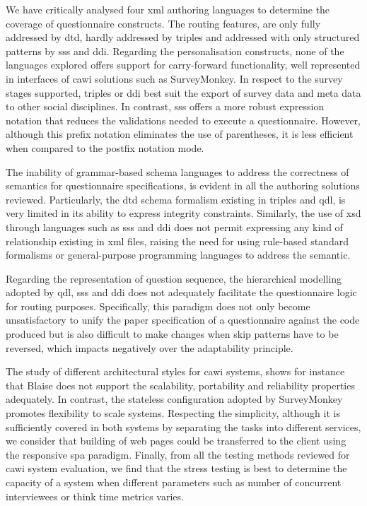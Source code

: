 	We have critically analysed four \gls{xml} authoring languages to determine the coverage of questionnaire constructs. The routing features, are only fully addressed by \gls{dtd}, hardly addressed by \gls{triples} and addressed with only structured patterns by \gls{sss} and \gls{ddi}. Regarding the personalisation constructs, none of the languages explored offers support for carry-forward functionality, well represented in interfaces of \gls{cawi} solutions such as SurveyMonkey. In respect to the survey stages supported, \gls{triples} or \gls{ddi} best suit the export of survey data and meta data to other social disciplines. In contrast, \gls{sss} offers a more robust expression notation that reduces the validations needed to execute a questionnaire. However, although this prefix notation eliminates the use of parentheses, it is less efficient when compared to the postfix notation mode.

	The inability of grammar-based schema languages to address the correctness of semantics for questionnaire specifications, is evident in all the authoring solutions reviewed. Particularly, the \gls{dtd} schema formalism existing in \gls{triples} and \gls{qdl}, is very limited in its ability to express integrity constraints. Similarly, the use of \gls{xsd} through languages such as \gls{sss} and \gls{ddi} does not permit expressing any kind of relationship existing in \gls{xml} files, raising the need for using rule-based standard formalisms or general-purpose programming languages to address the semantic.

	Regarding the representation of question sequence, the hierarchical modelling adopted by \gls{qdl}, \gls{sss} and \gls{ddi} does not adequately facilitate the questionnaire logic for routing purposes. Specifically, this paradigm does not only become unsatisfactory to unify the paper specification of a questionnaire against the code produced but is also difficult to make changes when skip patterns have to be reversed, which impacts negatively over the adaptability principle.

	The study of different architectural styles for \gls{cawi} systems, shows for instance that Blaise does not support the scalability, portability and reliability properties adequately. In contrast, the stateless configuration adopted by SurveyMonkey promotes flexibility to scale systems. Respecting the simplicity, although it is sufficiently covered in both systems by separating the tasks into different services, we consider that building of web pages could be transferred to the client using the responsive \gls{spa} paradigm. Finally, from all the testing methods reviewed for \gls{cawi} system evaluation, we find that the stress testing is best to determine the capacity of a system when different parameters such as number of concurrent interviewees or think time metrics varies.
